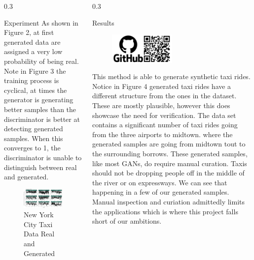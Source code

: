 \documentclass{msuposter}
\newcommand{\colwidth}{0.3\linewidth}
\begin{document}
\begin{frame}{}
\begin{columns}[t]
\begin{column}{\colwidth}
\begin{block}{Experiment}
As shown in Figure 2, at first generated data are assigned a very low probability of being real. Note in Figure 3 the training process is cyclical, at times the generator is generating better samples than the discriminator is better at detecting generated samples. When this converges to 1, the discriminator is unable to distinguish between real and generated. 
\newline
\begin{figure}
  \includegraphics[width=\linewidth]{gan_converging.png}
  	\caption{\label{fig:my-label} New York City Taxi Data Real and Generated}
\end{figure}


\end{block}
\end{column}


\begin{column}{\colwidth}


\begin{block}{Results}

\begin{figure}
\centering
\includegraphics[width=0.5\textwidth]{github.png}
\end{figure}
This method is able to generate synthetic taxi rides. Notice in Figure 4 generated taxi rides have a different structure from the ones in the dataset. These are mostly plausible, however this does showcase the need for verification. The data set contains a significant number of taxi rides going from the three airports to midtown. where the generated samples are going from midtown tout to the surrounding borrows. These generated samples, like most GANs, do require manual curation. Taxis should not be dropping people off in the middle of the river or on expressways. We can see that happening in a few of our generated samples. Manual inspection and curiation admittedly  limits the applications which is where this project falls short of our ambitions. 
\newline


\end{block}
\end{column}
\end{columns}
\end{frame}
\end{document}
